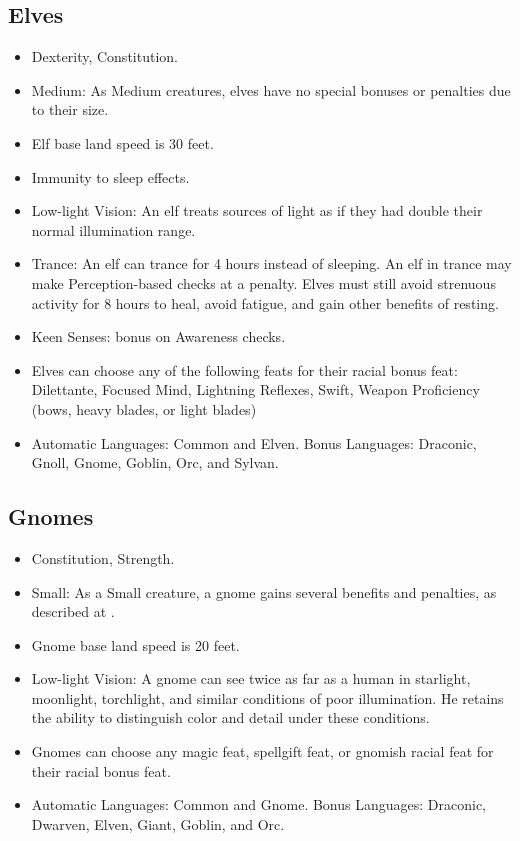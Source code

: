 \subsection{Elves}
\begin{itemize}
\item {} Dexterity,  Constitution.
\item Medium: As Medium creatures, elves have no special bonuses or penalties due to their size.
\item Elf base land speed is 30 feet.
\item Immunity to sleep effects.
\item Low-light Vision: An elf treats sources of light as if they had double their normal illumination range.
 \item Trance: An elf can trance for 4 hours instead of sleeping. An elf in trance may make Perception-based checks at a  penalty. Elves must still avoid strenuous activity for 8 hours to heal, avoid fatigue, and gain other benefits of resting.
\item Keen Senses:  bonus on Awareness checks.
\item Elves can choose any of the following feats for their racial bonus feat: Dilettante, Focused Mind, Lightning Reflexes, Swift, Weapon Proficiency (bows, heavy blades, or light blades)
\item Automatic Languages: Common and Elven. Bonus Languages: Draconic, Gnoll, Gnome, Goblin, Orc, and Sylvan.
\end{itemize}

\subsection{Gnomes}
\begin{itemize}
\item {} Constitution,  Strength.
\item Small: As a Small creature, a gnome gains several benefits and penalties, as described at .
\item Gnome base land speed is 20 feet.
\item Low-light Vision: A gnome can see twice as far as a human in starlight, moonlight, torchlight, and similar conditions of poor illumination. He retains the ability to distinguish color and detail under these conditions.

\item Gnomes can choose any magic feat, spellgift feat, or gnomish racial feat for their racial bonus feat.
\item Automatic Languages: Common and Gnome. Bonus Languages: Draconic, Dwarven, Elven, Giant, Goblin, and Orc.
\end{itemize}

